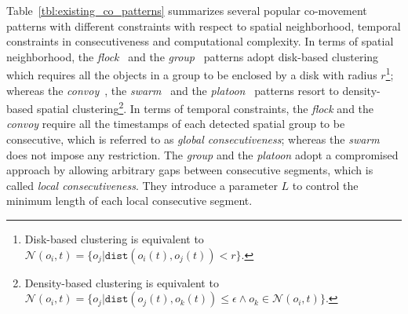%

Table~\ref{tbl:existing_co_patterns} summarizes several popular co-movement patterns 
with different constraints with respect to spatial neighborhood,
temporal constraints in consecutiveness and computational complexity. 
In terms of spatial neighborhood, the \emph{flock}~\cite{gudmundsson2006computing} 
and the \emph{group}~\cite{wang2006grouppattern} patterns adopt disk-based clustering which requires
all the objects in a group to be enclosed by a disk with radius $r$\footnote{Disk-based clustering is equivalent to $\mathcal{N}(o_i, t) = \{o_j | \mathtt{dist}(o_i(t),o_j(t)) < r\}$.}; whereas the \emph{convoy}~\cite{jeung2008discovery}, the \emph{swarm}~\cite{li2010swarm} 
and the \emph{platoon}~\cite{li2015platoon} patterns resort to density-based 
spatial clustering\footnote{Density-based clustering is equivalent to $\mathcal{N}(o_i,t) = \{o_j | \mathtt{dist}(o_j(t), o_k(t)) \leq \epsilon \wedge o_k \in \mathcal{N}(o_i, t)\}$.}.  In terms of temporal constraints, the \emph{flock}  %
and the \emph{convoy} %
require all the timestamps 
of each detected spatial group to be consecutive, which is referred to as \emph{global consecutiveness}; 
whereas the \emph{swarm} %
does not impose any restriction. 
The \emph{group} %
and the \emph{platoon} %
adopt a compromised approach by allowing
arbitrary gaps between consecutive segments, which is called \emph{local consecutiveness}. 
They introduce a parameter $L$ to control the minimum length of each local consecutive segment.

